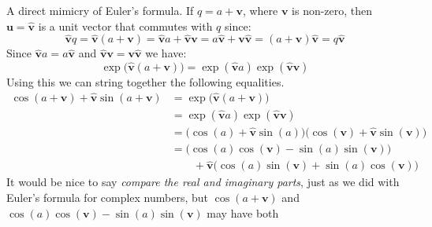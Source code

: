 \documentclass{article}
\theoremstyle{plain}
\theoremstyle{normal}
\begin{document}
            A direct mimicry of Euler's formula. If
            $q=a+\mathbf{v}$, where $\mathbf{v}$ is non-zero,
            then $\mathbf{u}=\hat{\mathbf{v}}$ is a unit vector that commutes
            with $q$ since:
            \begin{equation}
                \hat{\mathbf{v}}q
                =\hat{\mathbf{v}}(a+\mathbf{v})
                =\hat{\mathbf{v}}a+\hat{\mathbf{v}}\mathbf{v}
                =a\hat{\mathbf{v}}+\mathbf{v}\hat{\mathbf{v}}
                =(a+\mathbf{v})\hat{\mathbf{v}}
                =q\hat{\mathbf{v}}
            \end{equation}
            Since $\hat{\mathbf{v}}a=a\hat{\mathbf{v}}$ and
            $\hat{\mathbf{v}}\mathbf{v}=\mathbf{v}\hat{\mathbf{v}}$
            we have:
            \begin{equation}
                \exp\big(\hat{\mathbf{v}}(a+\mathbf{v})\big)=
                \exp(\hat{\mathbf{v}}a)\exp(\hat{\mathbf{v}}\mathbf{v})
            \end{equation}
            Using this we can string together the following equalities.
            \begin{subequations}
                \begin{align}
                    \cos(a+\mathbf{v})+\hat{\mathbf{v}}\sin(a+\mathbf{v})
                    &=\exp\big(\hat{\mathbf{v}}(a+\mathbf{v})\big)\\
                    &=\exp(\hat{\mathbf{v}}a)\exp(\hat{\mathbf{v}}\mathbf{v})\\
                    &=\Big(\cos(a)+\hat{\mathbf{v}}\sin(a)\Big)\Big(
                            \cos(\mathbf{v})+\hat{\mathbf{v}}\sin(\mathbf{v})
                        \Big)\\
                    &=\Big(\cos(a)\cos(\mathbf{v})-\sin(a)\sin(\mathbf{v})\Big)
                        \nonumber\\
                        &\hspace{2em}
                        +\hat{\mathbf{v}}\Big(
                            \cos(a)\sin(\mathbf{v})+\sin(a)\cos(\mathbf{v})
                        \Big)
                \end{align}
            \end{subequations}
            It would be nice to say
            \textit{compare the real and imaginary parts}, just as we did with
            Euler's formula for complex numbers, but
            $\cos(a+\mathbf{v})$ and
            $\cos(a)\cos(\mathbf{v})-\sin(a)\sin(\mathbf{v})$ may have both
\end{document}
